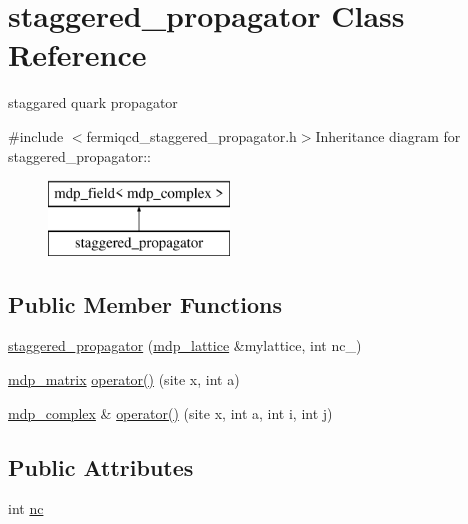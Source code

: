 \hypertarget{classstaggered__propagator}{
\section{staggered\_\-propagator Class Reference}
\label{classstaggered__propagator}
}


staggared quark propagator  


{\ttfamily \#include $<$fermiqcd\_\-staggered\_\-propagator.h$>$}Inheritance diagram for staggered\_\-propagator::\begin{figure}[H]
\begin{center}
\leavevmode
\includegraphics[height=2cm]{classstaggered__propagator}
\end{center}
\end{figure}
\subsection*{Public Member Functions}
\begin{DoxyCompactItemize}
\item 
\hyperlink{classstaggered__propagator_ad2abd9534d09d4f0af54a53ed4e092c6}{staggered\_\-propagator} (\hyperlink{classmdp__lattice}{mdp\_\-lattice} \&mylattice, int nc\_\-)
\item 
\hyperlink{classmdp__matrix}{mdp\_\-matrix} \hyperlink{classstaggered__propagator_ae5c5d6720631c30938b09de4d3331e7f}{operator()} (site x, int a)
\item 
\hyperlink{classmdp__complex}{mdp\_\-complex} \& \hyperlink{classstaggered__propagator_aed9bbdd906e6e68f806a895c5e1bd2d8}{operator()} (site x, int a, int i, int j)
\end{DoxyCompactItemize}
\subsection*{Public Attributes}
\begin{DoxyCompactItemize}
\item 
int \hyperlink{classstaggered__propagator_a1f2816b7b6b4f9b6779224fcdd0d6aff}{nc}
\end{DoxyCompactItemize}
